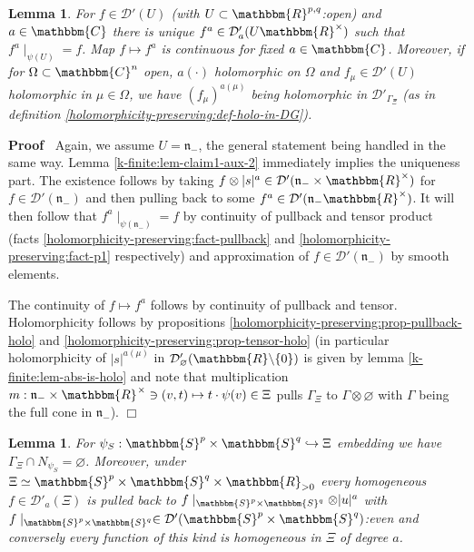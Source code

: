 \documentclass{article}
\renewenvironment{proof}{\noindent\textbf{Proof\ }}{\hspace*{\fill}$\Box$\medskip}
\newtheorem{lemma}[proposition]{Lemma}
\theoremstyle{remark}
\begin{document}
\begin{lemma}
  \label{k-finite:lem-claim1}For $f \in \mathcal{D}' (U)$ (with $U \subset
  \mathbbm{R}^{p, q}$:open) and $a \in \mathbbm{C}$ there is unique $f^a \in
  \mathcal{D}'_a (U\mathbbm{R}^{\times})$ such that $f^a \mid_{\psi (U)} =
  f$. Map $f \mapsto f^a$ is continuous for fixed $a \in \mathbbm{C}$.
  Moreover, if for $\Omega \subset \mathbbm{C}^n$ open, $a (\cdot)$
  holomorphic on $\Omega$ and $f_{\mu} \in \mathcal{D}' (U)$ holomorphic in
  $\mu \in \Omega$, we have $(f_{\mu})^{a (\mu)}$ being holomorphic in
  $\mathcal{D}'_{\Gamma_{\Xi}}$ (as in definition
  \ref{holomorphicity-preserving:def-holo-in-DG}).
\end{lemma}

\begin{proof}
  Again, we assume $U =\mathfrak{n}_-$, the general statement being handled in
  the same way. Lemma \ref{k-finite:lem-claim1-aux-2} immediately implies the
  uniqueness part. The existence follows by taking $f \otimes | s |^a \in
  \mathcal{D}' (\mathfrak{n}_- \times \mathbbm{R}^{\times})$ for $f \in
  \mathcal{D}' (\mathfrak{n}_-)$ and then pulling back to some $f^a \in
  \mathcal{D}' (\mathfrak{n}_- \mathbbm{R}^{\times})$. It will then follow
  that $f^a \mid_{\psi (\mathfrak{n}_-)} = f$ by continuity of pullback
  and tensor product (facts \ref{holomorphicity-preserving:fact-pullback} and
  \ref{holomorphicity-preserving:fact-p1} respectively) and approximation of
  $f \in \mathcal{D}' (\mathfrak{n}_-)$ by smooth elements.
  
  The continuity of $f \mapsto f^a$ follows by continuity of pullback and
  tensor. Holomorphicity follows by propositions
  \ref{holomorphicity-preserving:prop-pullback-holo} and
  \ref{holomorphicity-preserving:prop-tensor-holo} (in particular
  holomorphicity of $| s |^{a (\mu)}$ in $\mathcal{D}'_{\varnothing}
  (\mathbbm{R}\backslash \{ 0 \})$ is given by lemma
  \ref{k-finite:lem-abs-is-holo} and note that multiplication $m :
  \mathfrak{n}_- \times \mathbbm{R}^{^{} \times} \ni (v, t) \mapsto t \cdot
  \psi (v) \in \Xi$ pulls $\Gamma_{\Xi}$ to $\Gamma \otimes \varnothing$ with
  $\Gamma$ being the full cone in $\mathfrak{n}_-$).
\end{proof}

\begin{lemma}
  \label{k-finite:lem-restriction-to-S}For $\psi_S : \mathbbm{S}^p \times
  \mathbbm{S}^q \hookrightarrow \Xi$ embedding we have $\Gamma_{\Xi} \cap
  N_{\psi_S} = \varnothing$. Moreover, under $\Xi \simeq \mathbbm{S}^p \times
  \mathbbm{S}^q \times \mathbbm{R}_{> 0}$ every homogeneous $f \in
  \mathcal{D}'_a (\Xi)$ is pulled back to $f \mid_{\mathbbm{S}^p \times
  \mathbbm{S}^q} \otimes | u |^a$ with $f \mid_{\mathbbm{S}^p \times
  \mathbbm{S}^q} \in \mathcal{D}' (\mathbbm{S}^p \times \mathbbm{S}^q)$:even
  and conversely every function of this kind is homogeneous in $\Xi$ of degree
  $a$.
\end{lemma}
\end{document}

